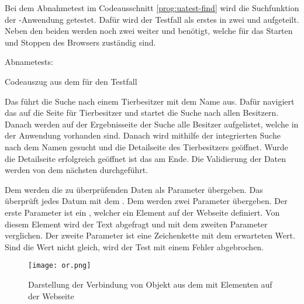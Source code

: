 Bei dem  Abnahmetest im Codeausschnitt \ref{prog:uatest-find} wird die Suchfunktion der -Anwendung getestet. Dafür wird der Testfall als erstes in zwei   und  aufgeteilt. Neben den beiden  werden noch zwei weiter   und   benötigt, welche für das Starten und Stoppen des Browsers zuständig sind. 

\begin{program}

\caption{Abnametests: }
\label{prog:uatest-find}
\end{program}


\begin{program}

\caption{Codeauszug aus dem  für den Testfall }
\label{prog:or-find}
\end{program}

\SuperPar
Das   führt die Suche nach einem Tierbesitzer mit dem Name  aus. Dafür navigiert das  auf die Seite für Tierbesitzer und startet die Suche nach allen Besitzern. Danach werden auf der Ergebnisseite der Suche alle Besitzer aufgelistet, welche in der Anwendung vorhanden sind. Danach wird mithilfe der integrierten Suche nach dem Namen  gesucht und die Detailseite des Tierbesitzers geöffnet. Wurde die Detailseite erfolgreich geöffnet ist das  am Ende. Die Validierung der Daten werden von dem nächsten   durchgeführt.

\SuperPar
Dem   werden die zu überprüfenden Daten als Parameter übergeben. Das  überprüft jedes Datum mit dem  . Dem  werden zwei Parameter übergeben. Der erste Parameter ist ein , welcher ein Element auf der Webseite definiert. Von diesem Element wird der Text abgefragt und mit dem zweiten Parameter verglichen. Der zweite Parameter ist eine Zeichenkette mit dem erwarteten Wert. Sind die Wert nicht gleich, wird der Test mit einem Fehler abgebrochen. 

\begin{figure}
\centering
\texttt{[image: or.png]}
\caption{Darstellung der Verbindung von Objekt aus dem  mit Elementen auf der Webseite}
\label{fig:orwebsite}
\end{figure}

